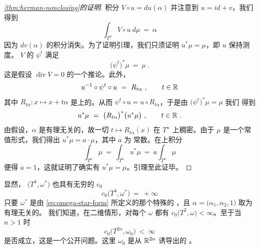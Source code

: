 \begin{proof}[\cref*{thm:herman-nonclosing}的证明]
积分 $V\circ u=du(\alpha)$ 并注意到 $u=id+v$，我们得到
\[
\int_{T^{n}}V\circ u\ d\mu\ =\ \alpha
\]
因为 $dv(\alpha)$ 的积分消失。为了证明引理，我们只须证明 $u^{*}\mu=\mu$，即 $u$%
保持\trLebesgue{}测度。\trVectorField{} $V$ 的\trFlow{} $\psi^{t}$ 满足
\[
\bigl(\psi^{t}\bigr)^{*}\mu\ =\ \mu\ .
\]
这是假设 $\operatorname{div}V=0$ 的一个推论。此外，
\[
u^{-1}\circ\psi^{t}\circ u\ =\ R_{t\alpha}\ ,\qquad t\in\mathbb{R}
\]
其中 $R_{t\alpha}:x\mapsto x+t\alpha$ 是\trTorus{}上的\trTranslation。从而%
$\psi^{t}\circ u=u\circ R_{t\alpha}$，于是由 $\bigl(\psi^{t}\bigr)^{*}\mu=\mu$ 我们%
得到
\[
u^{*}\mu\ =\ \bigl(R_{t\alpha}\bigr)^{*}\bigl(u^{*}\mu\bigr)\ ,\qquad t\in\R\ .
\]
由假设，$\alpha$ 是有理无关的，故一切\trOrbit{} $t\mapsto R_{t\alpha}(x)$ 在 $T^{n}$%
上稠密。由于 $\mu$ 是一个常值形式，我们得出 $u^{*}\mu=a\cdot\mu$，其中 $a$ 为%
常数。在\trTorus{}上积分
\[
\int_{T^{n}}\mu\ =\ \int_{T^{n}}u^{*}\mu\ =\ a\int_{T^{n}}\mu
\]
便得 $a=1$，这就证明了确实有 $u^{*}\mu=\mu$。引理至此证毕。
\end{proof}

显然，\trSymplecticManifold{} $\bigl(T^{4},\omega^{*}\bigr)$ 也具有无穷的%
\trCapacity{} $c_{0}$
\[
c_{0}\bigl(T^{4},\omega^{*}\bigr)\ =\ +\infty
\]
只要 $\omega^{*}$ 是由 \eqref{eq:omega-star-form} 所定义的那个特殊的%
\trSymplecticStructure，且 $\alpha=\bigl(\alpha_{1},\alpha_{2},1\bigr)$ 取为有理无关的。%
我们知道，在二维情形，对每个\trVolumeForm{} $\omega$ 都有%
$c_{0}\bigl(T^{2},\omega\bigr)<\infty$。至于当 $n>1$ 时
\[
c_{0}\bigl(T^{2n},\omega_{0}\bigr)\ <\ \infty
\]
是否成立，这是一个公开问题。这里 $\omega_{0}$ 是从 $\mathbb{R}^{2n}$ 诱导出的%
\trStandard\trSymplecticStructure。
